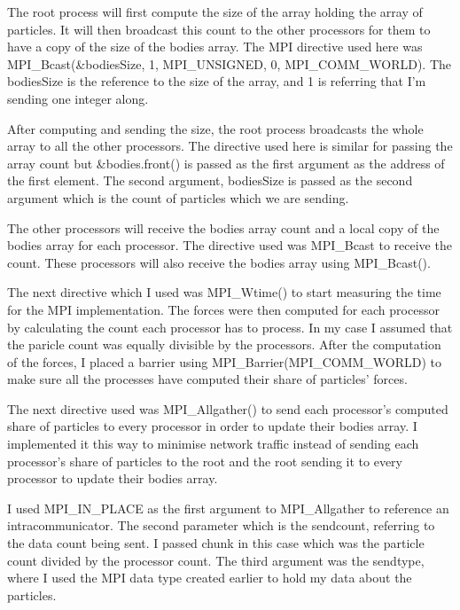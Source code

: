 \documentclass[12pt]{IEEEtran}
\begin{document}
The root process will first compute the size of the array holding the array of particles. It will then broadcast this count to the other processors for them to have a copy of the size of the bodies array. The MPI directive used here was MPI\_Bcast(\&bodiesSize, 1, MPI\_UNSIGNED, 0, MPI\_COMM\_WORLD). The bodiesSize is the reference to the size of the array, and 1 is referring that I'm sending one integer along.
\medskip

After computing and sending the size, the root process broadcasts the whole array to all the other processors. The directive used here is similar for passing the array count but \&bodies.front() is passed as the first argument as the address of the first element. The second argument, bodiesSize is passed as the second argument which is the count of particles which we are sending.
\medskip

The other processors will receive the bodies array count and a local copy of the bodies array for each processor. The directive used was MPI\_Bcast to receive the count. These processors will also receive the bodies array using MPI\_Bcast().
\medskip

The next directive which I used was MPI\_Wtime() to start measuring the time for the MPI implementation. The forces were then computed for each processor by calculating the count each processor has to process. In my case I assumed that the paricle count was equally divisible by the processors. After the computation of the forces, I placed a barrier using MPI\_Barrier(MPI\_COMM\_WORLD) to make sure all the processes have computed their share of particles' forces. 
\medskip


The next directive used was MPI\_Allgather() to send each processor's computed share of particles to every processor in order to update their bodies array. I implemented it this way to minimise network traffic instead of sending each processor's share of particles to the root and the root sending it to every processor to update their bodies array.
\medskip

I used MPI\_IN\_PLACE as the first argument to MPI\_Allgather to reference an intracommunicator. The second parameter which is the sendcount, referring to the data count being sent. I passed chunk in this case which was the particle count divided by the processor count. The third argument was the sendtype, where I used the MPI data type created earlier to hold my data about the particles. 
\medskip
\end{document}
